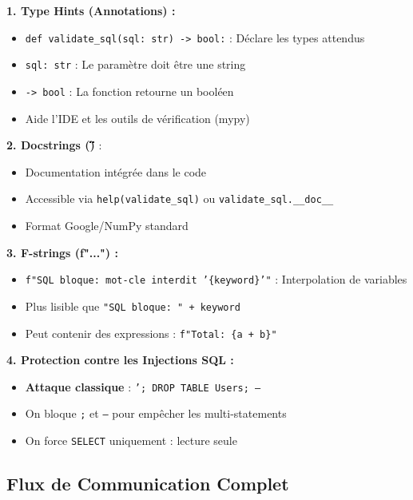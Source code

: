 \documentclass[12pt,a4paper]{article}
\begin{document}
\begin{infobox}[title={\faLightbulb\ Concepts Python et Sécurité}]
\textbf{1. Type Hints (Annotations) :}
\begin{itemize}
    \item \texttt{def validate\_sql(sql: str) -> bool:} : Déclare les types attendus
    \item \texttt{sql: str} : Le paramètre doit être une string
    \item \texttt{-> bool} : La fonction retourne un booléen
    \item Aide l'IDE et les outils de vérification (mypy)
\end{itemize}

\textbf{2. Docstrings (\"\"\" \"\"\")} :
\begin{itemize}
    \item Documentation intégrée dans le code
    \item Accessible via \texttt{help(validate\_sql)} ou \texttt{validate\_sql.\_\_doc\_\_}
    \item Format Google/NumPy standard
\end{itemize}

\textbf{3. F-strings (f"...") :}
\begin{itemize}
    \item \texttt{f"SQL bloque: mot-cle interdit '\{keyword\}'"} : Interpolation de variables
    \item Plus lisible que \texttt{"SQL bloque: " + keyword}
    \item Peut contenir des expressions : \texttt{f"Total: \{a + b\}"}
\end{itemize}

\textbf{4. Protection contre les Injections SQL :}
\begin{itemize}
    \item \textbf{Attaque classique} : \texttt{'; DROP TABLE Users; --}
    \item On bloque \texttt{;} et \texttt{--} pour empêcher les multi-statements
    \item On force \texttt{SELECT} uniquement : lecture seule
\end{itemize}
\end{infobox}

\subsection{Flux de Communication Complet}
\end{document}
